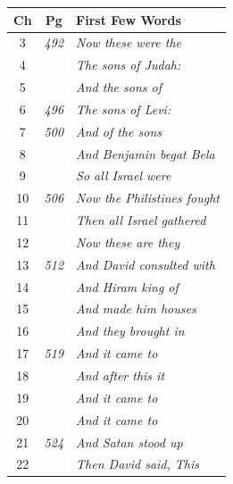 \documentclass{article}
\newlength{\minipageheight}
\newlength{\minipagewidth}
\begin{document}
\begin{minipage}[r][\minipageheight][t]{\minipagewidth}%
    \renewcommand{\arraystretch}{0.95}
    \begin{longtable}{ccl}
        \textbf{Ch} & \textbf{Pg}  & \textbf{First Few Words}             \\%
        \hline%
        \endfirsthead%
        3           & \textit{492} & \textit{Now these were the}          \\
        4           &              & \textit{The sons of Judah:}          \\
        5           &              & \textit{And the sons of}             \\
        6           & \textit{496} & \textit{The sons of Levi:}           \\
        7           & \textit{500} & \textit{And of the sons}             \\
        8           &              & \textit{And Benjamin begat Bela}     \\
        9           &              & \textit{So all Israel were}          \\
        10          & \textit{506} & \textit{Now the Philistines fought}  \\
        11          &              & \textit{Then all Israel gathered}    \\
        12          &              & \textit{Now these are they}          \\
        13          & \textit{512} & \textit{And David consulted with}    \\
        14          &              & \textit{And Hiram king of}           \\
        15          &              & \textit{And made him houses}         \\
        16          &              & \textit{And they brought in}         \\
        17          & \textit{519} & \textit{And it came to}              \\
        18          &              & \textit{And after this it}           \\
        19          &              & \textit{And it came to}              \\
        20          &              & \textit{And it came to}              \\
        21          & \textit{524} & \textit{And Satan stood up}          \\
        22          &              & \textit{Then David said, This}       \\

\end{longtable}
\end{minipage}
\end{document}
